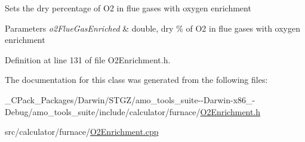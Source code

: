 Sets the dry percentage of O2 in flue gases with oxygen enrichment 
\begin{DoxyParams}{Parameters}
{\em o2\+Flue\+Gas\+Enriched} & double, dry \% of O2 in flue gases with oxygen enrichment \\
\hline
\end{DoxyParams}


Definition at line 131 of file O2\+Enrichment.\+h.



The documentation for this class was generated from the following files\+:\begin{DoxyCompactItemize}
\item 
\+\_\+\+C\+Pack\+\_\+\+Packages/\+Darwin/\+S\+T\+G\+Z/amo\+\_\+tools\+\_\+suite-\/-\/\+Darwin-\/x86\+\_-\/\+Debug/amo\+\_\+tools\+\_\+suite/include/calculator/furnace/\hyperlink{___c_pack___packages_2_darwin_2_s_t_g_z_2amo__tools__suite--_darwin-x86__64-_debug_2amo__tools__4edde237d4d4c2a51a71f2e4a7d321aa}{O2\+Enrichment.\+h}\item 
src/calculator/furnace/\hyperlink{_o2_enrichment_8cpp}{O2\+Enrichment.\+cpp}\end{DoxyCompactItemize}
